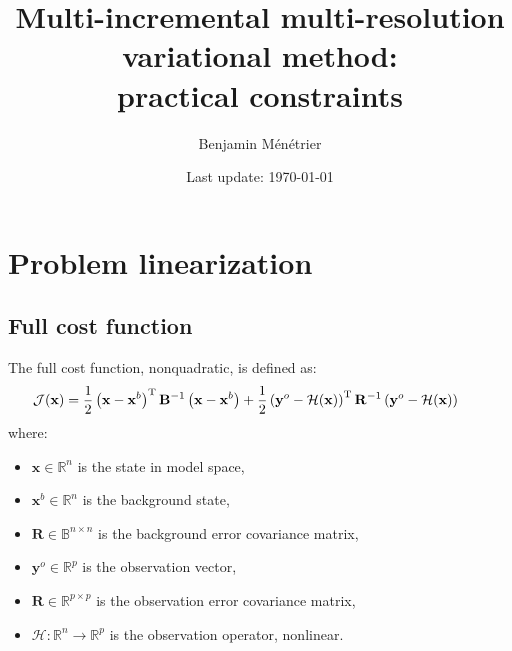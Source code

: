\documentclass[12pt]{scrartcl}
\begin{document}
\title{\vspace{-1.2cm}Multi-incremental multi-resolution variational method:\\ practical constraints}
\author{Benjamin Ménétrier}
\date{Last update: \today\vspace{-0.5cm}}

\thispagestyle{empty}

\maketitle

\tableofcontents

\clearpage

\section{Problem linearization}

\subsection{Full cost function}
The full cost function, nonquadratic, is defined as:
\begin{align}
\hspace{-0.7cm} \mathcal{J}(\mathbf{x}) = \frac{1}{2} \left(\mathbf{x}-\mathbf{x}^b\right)^\mathrm{T} \mathbf{B}^{-1} \left(\mathbf{x}-\mathbf{x}^b\right) + \frac{1}{2} \left(\mathbf{y}^o-\mathcal{H}(\mathbf{x})\right)^\mathrm{T} \mathbf{R}^{-1} \left(\mathbf{y}^o-\mathcal{H}(\mathbf{x})\right)
\end{align}
where:
\begin{itemize}
\item $\mathbf{x} \in \mathbb{R}^n$ is the state in model space,
\item $\mathbf{x}^b \in \mathbb{R}^n$ is the background state,
\item $\mathbf{R} \in \mathbb{B}^{n \times n}$ is the background error covariance matrix,
\item $\mathbf{y}^o \in \mathbb{R}^p$ is the observation vector,
\item $\mathbf{R} \in \mathbb{R}^{p \times p}$ is the observation error covariance matrix,
\item $\mathcal{H} : \mathbb{R}^n \rightarrow \mathbb{R}^p$ is the observation operator, nonlinear.
\end{itemize}
\end{document}

